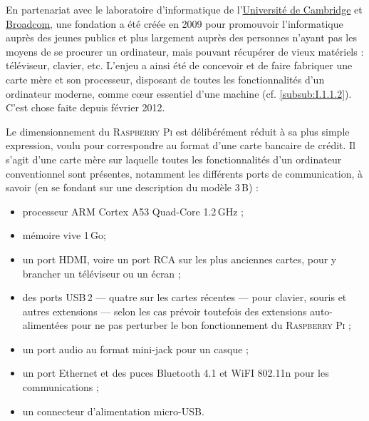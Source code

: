 En partenariat avec le laboratoire d'informatique de l'\href{https://www.cam.ac.uk/}{Université de Cambridge} et \href{https://www.broadcom.com/}{Broadcom}, une fondation a été créée en 2009 pour promouvoir l'informatique auprès des jeunes publics et plus largement auprès des personnes n'ayant pas les moyens de se procurer un ordinateur, mais pouvant récupérer de vieux matériels : téléviseur, clavier, etc. L'enjeu a ainsi été de concevoir et de faire fabriquer une carte mère et son processeur, disposant de toutes les fonctionnalités d'un ordinateur moderne, comme cœur essentiel d'une machine (cf. \cref{subsub:I.1.1.2}). C'est chose faite depuis février 2012.

Le dimensionnement du \textsc{Raspberry Pi} est délibérément réduit à sa plus simple expression, voulu pour correspondre au format d'une carte bancaire de crédit. Il s'agit d'une carte mère sur laquelle toutes les fonctionnalités d'un ordinateur conventionnel sont présentes, notamment les différents ports de communication, à savoir (en se fondant sur une description du modèle 3\,B) :
\setlength{\columnsep}{-10pt}
\begin{multicols}{2}
\begin{itemize}\jazzitem
\item processeur ARM Cortex A53 Quad-Core 1.2\,GHz ;
\item mémoire vive 1\,Go;
\item un port HDMI, voire un port RCA sur les plus anciennes cartes, pour y brancher un téléviseur ou un écran ;
\item des ports USB\,2 --- quatre sur les cartes récentes --- pour clavier, souris et autres extensions --- selon les cas prévoir toutefois des extensions auto-alimentées pour ne pas perturber le bon fonctionnement du \textsc{Raspberry Pi} ;
\item un port audio au format mini-jack pour un casque ;
\item un port Ethernet et des puces Bluetooth 4.1 et WiFI 802.11n pour les communications ;
\item un connecteur d'alimentation micro-USB.
\end{itemize}
\end{multicols}



